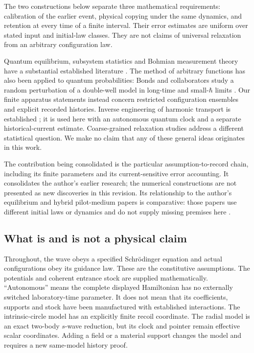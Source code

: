 \documentclass[11pt]{article}
\theoremstyle{definition}\newtheorem{definition}[theorem]{Definition}
\theoremstyle{remark}\newtheorem{remark}[theorem]{Remark}
\begin{document}
The two constructions below separate three mathematical requirements:
calibration of the earlier event, physical copying under the same dynamics,
and retention at every time of a finite interval. Their error estimates are
uniform over stated input and initial-law classes. They are not claims of
universal relaxation from an arbitrary configuration law.

Quantum equilibrium, subsystem statistics and Bohmian measurement theory
have a substantial established literature \cite{DGZ,Operators}. The method of
arbitrary functions has also been applied to quantum probabilities: Bonds
and collaborators study a random perturbation of a double-well model in
long-time and small-$\hbar$ limits \cite{Bonds}. Our finite apparatus statements
instead concern restricted configuration ensembles and explicit recorded
histories. Inverse engineering of harmonic transport is established
\cite{Tor}; it is used here with an autonomous quantum clock and a separate
historical-current estimate. Coarse-grained relaxation studies
\cite{ValentiniWestman} address a different statistical question. We make no
claim that any of these general ideas originates in this work.

The contribution being consolidated is the particular assumption-to-record
chain, including its finite parameters and its current-sensitive error
accounting. It consolidates the author's earlier research; the numerical constructions
are not presented as new discoveries in this revision. Its relationship to the author's
equilibrium and hybrid pilot-medium papers is comparative: those papers use
different initial laws or dynamics and do not supply missing premises here
\cite{RodgersMonograph,RodgersMassive,RodgersPilot}.

\subsection{What is and is not a physical claim}
Throughout, the wave obeys a specified Schr\"odinger equation and actual
configurations obey its guidance law. These are the constitutive assumptions.
The potentials and coherent entrance stock are supplied mathematically.
``Autonomous'' means the complete displayed Hamiltonian has no externally
switched laboratory-time parameter. It does not mean that its coefficients,
supports and stock have been manufactured with established interactions.
The intrinsic-circle model has an explicitly finite recoil coordinate.
The radial model is an exact two-body $s$-wave reduction, but its clock and
pointer remain effective scalar coordinates. Adding a field or a material
support changes the model and requires a new same-model history proof.
\end{document}
